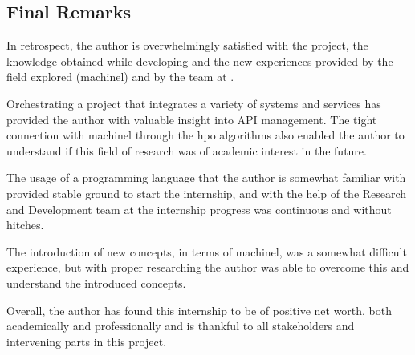 
\subsection{Final Remarks}

In retrospect, the author is overwhelmingly satisfied with the project, the knowledge obtained while developing and the new experiences provided by the field explored (\acrshort{machinel}) and by the team at \faro.

Orchestrating a project that integrates a variety of systems and services has provided the author with valuable insight into API management. The tight connection with \acrshort{machinel} through the \acrshort{hpo} algorithms also enabled the author to understand if this field of research was of academic interest in the future.

The usage of a programming language that the author is somewhat familiar with provided stable ground to start the internship, and with the help of the Research and Development team at \faro the internship progress was continuous and without hitches.

The introduction of new concepts, in terms of \acrshort{machinel}, was a somewhat difficult experience, but with proper researching the author was able to overcome this and understand the introduced concepts.

Overall, the author has found this internship to be of positive net worth, both academically and professionally and is thankful to all stakeholders and intervening parts in this project.